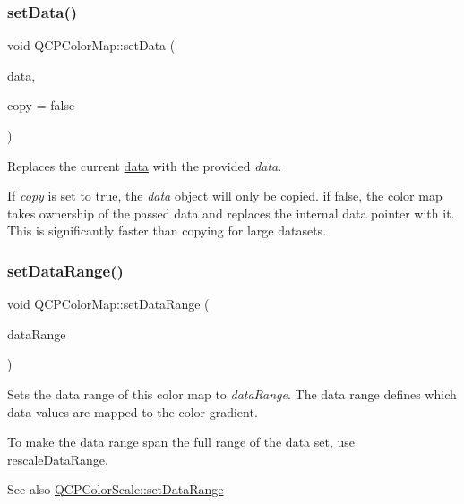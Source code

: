 \subsubsection{\texorpdfstring{set\+Data()}{setData()}}
{\footnotesize\ttfamily void Q\+C\+P\+Color\+Map\+::set\+Data (\begin{DoxyParamCaption}\item[{\mbox{\hyperlink{class_q_c_p_color_map_data}{Q\+C\+P\+Color\+Map\+Data}} $\ast$}]{data,  }\item[{bool}]{copy = {\ttfamily false} }\end{DoxyParamCaption})}

Replaces the current \mbox{\hyperlink{class_q_c_p_color_map_a047d7eb3ae657f93f2f39b5e68b79451}{data}} with the provided {\itshape data}.

If {\itshape copy} is set to true, the {\itshape data} object will only be copied. if false, the color map takes ownership of the passed data and replaces the internal data pointer with it. This is significantly faster than copying for large datasets. \mbox{\label{class_q_c_p_color_map_a980b42837821159786a85b4b7dcb8774}} 
\subsubsection{\texorpdfstring{set\+Data\+Range()}{setDataRange()}}
{\footnotesize\ttfamily void Q\+C\+P\+Color\+Map\+::set\+Data\+Range (\begin{DoxyParamCaption}\item[{const \mbox{\hyperlink{class_q_c_p_range}{Q\+C\+P\+Range}} \&}]{data\+Range }\end{DoxyParamCaption})}

Sets the data range of this color map to {\itshape data\+Range}. The data range defines which data values are mapped to the color gradient.

To make the data range span the full range of the data set, use \mbox{\hyperlink{class_q_c_p_color_map_a856608fa3dd1cc290bcd5f29a5575774}{rescale\+Data\+Range}}.

\begin{DoxySeeAlso}{See also}
\mbox{\hyperlink{class_q_c_p_color_scale_abe88633003a26d1e756aa74984587fef}{Q\+C\+P\+Color\+Scale\+::set\+Data\+Range}} 
\end{DoxySeeAlso}
\mbox{\label{class_q_c_p_color_map_a9d20aa08e3c1f20f22908c45b9c06511}} 
